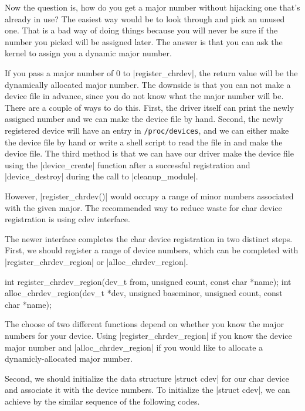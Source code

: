 \documentclass[10pt, oneside]{book}
\begin{document}
Now the question is, how do you get a major number without hijacking one that's already in use?
The easiest way would be to look through  and pick an unused one.
That is a bad way of doing things because you will never be sure if the number you picked will be assigned later.
The answer is that you can ask the kernel to assign you a dynamic major number.

If you pass a major number of 0 to \cpp|register_chrdev|, the return value will be the dynamically allocated major number.
The downside is that you can not make a device file in advance, since you do not know what the major number will be.
There are a couple of ways to do this.
First, the driver itself can print the newly assigned number and we can make the device file by hand.
Second, the newly registered device will have an entry in \verb|/proc/devices|, and we can either make the device file by hand or write a shell script to read the file in and make the device file.
The third method is that we can have our driver make the device file using the \cpp|device_create| function after a successful registration and \cpp|device_destroy| during the call to \cpp|cleanup_module|.

However, \cpp|register_chrdev()| would occupy a range of minor numbers associated with the given major.
The recommended way to reduce waste for char device registration is using cdev interface.

The newer interface completes the char device registration in two distinct steps.
First, we should register a range of device numbers, which can be completed with \cpp|register_chrdev_region| or \cpp|alloc_chrdev_region|.

\begin{code}
int register_chrdev_region(dev_t from, unsigned count, const char *name);
int alloc_chrdev_region(dev_t *dev, unsigned baseminor, unsigned count, const char *name);
\end{code}

The choose of two different functions depend on whether you know the major numbers for your device.
Using \cpp|register_chrdev_region| if you know the device major number and \cpp|alloc_chrdev_region| if you would like to allocate a dynamicly-allocated major number.

Second, we should initialize the data structure \cpp|struct cdev| for our char device and associate it with the device numbers.
To initialize the \cpp|struct cdev|, we can achieve by the similar sequence of the following codes.
\end{document}
